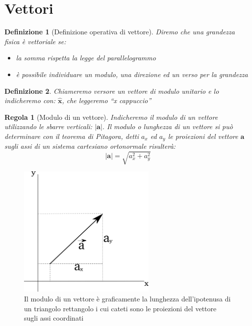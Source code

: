 \documentclass[a4paper,10pt,oneside]{article}
\newtheorem{definition}{Definizione}
\newtheorem{regola}{Regola}
\begin{document}
\section*{Vettori}

\begin{definition}[Definizione operativa di vettore]
Diremo che una grandezza fisica è vettoriale se:
\begin{itemize}
 \item la somma rispetta la legge del parallelogrammo
 \item è possibile individuare un modulo, una direzione ed un verso per la grandezza
\end{itemize}
\end{definition}
\begin{definition}
Chiameremo versore un vettore di modulo unitario e lo indicheremo con: $\hat{\mathbf{x}}$, che leggeremo ``x cappuccio''
\end{definition}

\begin{regola}[Modulo di un vettore]
 Indicheremo il modulo di un vettore utilizzando le sbarre verticali: $|\mathbf{a}|$. Il modulo o lunghezza di un vettore si può determinare con il teorema di Pitagora, detti $a_x$ ed $a_y$ le proiezioni del vettore $\mathbf{a}$ sugli assi di un sistema cartesiano ortonormale risulterà:
\begin{equation*}
 |\mathbf{a}|=\sqrt{a_x^2+a_y^2}
\end{equation*}
\end{regola}


\begin{figure}[H]
 \includegraphics[width=0.6\textwidth]{./immagini/pitagora.png}
 \caption{Il modulo di un vettore è graficamente la lunghezza dell'ipotenusa di un triangolo rettangolo i cui cateti sono le proiezioni del vettore sugli assi coordinati}
 \label{fig:modulo}
\end{figure}
\end{document}
